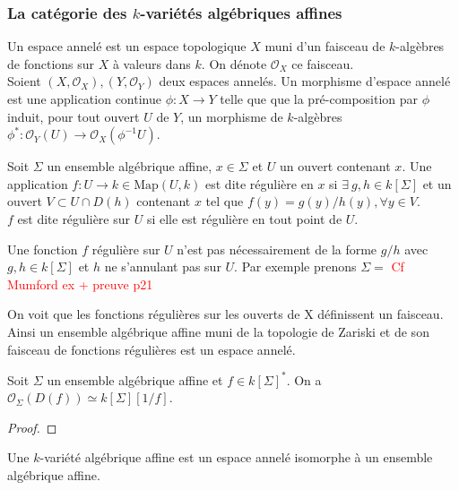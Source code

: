 \subsubsection{La catégorie des $k$-variétés algébriques affines}
\begin{defn}\label{espaceannele}
Un espace annelé est un espace topologique $X$ muni d'un faisceau de $k$-algèbres de fonctions sur $X$ à valeurs dans $k$. On dénote $\mathcal{O}_X$ ce faisceau.\\
Soient $(X, \mathcal{O}_X), (Y, \mathcal{O}_Y)$ deux espaces annelés. Un morphisme d'espace annelé est une application continue $\phi: X\rightarrow Y$ telle que que la pré-composition par $\phi$ induit, pour tout ouvert $U$ de $Y$, un morphisme de $k$-algèbres $\phi^*:\mathcal{O}_Y(U) \rightarrow \mathcal{O}_X(\phi^{-1}U)$.
\end{defn}

\begin{defn}
Soit $\Sigma$ un ensemble algébrique affine, $x\in \Sigma$ et $U$ un ouvert contenant $x$. Une application $f:U\rightarrow k\in \textrm{Map}(U,k)$ est dite régulière en $x$ si $\exists\ g,h\in k[\Sigma]$ et un ouvert $V\subset U\cap D(h)$ contenant $x$ tel que $f(y) = g(y)/h(y), \forall y\in V$.\\
$f$ est dite régulière sur $U$ si elle est régulière en tout point de $U$.
\end{defn}

\begin{rem}
Une fonction $f$ régulière sur $U$ n'est pas nécessairement de la forme $g/h$ avec $g,h\in k[\Sigma]$ et $h$ ne s'annulant pas sur $U$. Par exemple prenons $\Sigma =$ \textcolor{red}{Cf Mumford ex + preuve p21}
\end{rem}

On voit que les fonctions régulières sur les ouverts de X définissent un faisceau. Ainsi un ensemble algébrique affine muni de la topologie de Zariski et de son faisceau de fonctions régulières est un espace annelé. 

\begin{prop}
Soit $\Sigma$ un ensemble algébrique affine et $f\in k[\Sigma]^*$. On a $\mathcal{O}_\Sigma(D(f))\simeq k[\Sigma][1/f]$.
\end{prop}
\begin{proof}

\end{proof}

\begin{defn}
Une $k$-variété algébrique affine est un espace annelé isomorphe à un ensemble algébrique affine.
\end{defn}

